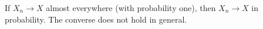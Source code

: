 If $X_n \to X$ almost everywhere (with probability one), then $X_n \to X$ in probability. The converse does not hold in general.
